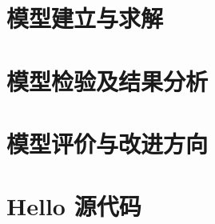 \documentclass[withoutpreface,bwprint]{cumcmthesis}
\begin{document}
\section{模型建立与求解}

\section{模型检验及结果分析}

\section{模型评价与改进方向}


\nocite{*}


\newpage
\appendix
\section{Hello 源代码}

\end{document}
